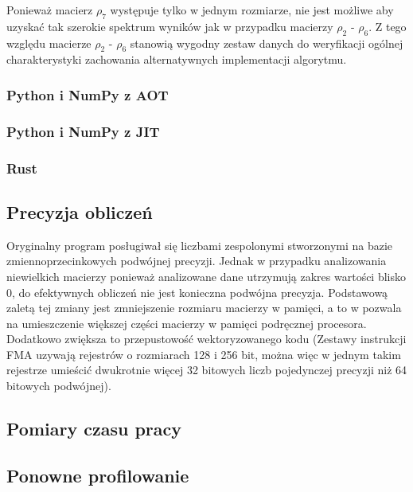 \documentclass[10pt, a4paper]{article}
\begin{document}
\begin{sloppypar}
    Ponieważ macierz $\rho_{7}$ występuje tylko w jednym rozmiarze, nie jest możliwe aby
    uzyskać tak szerokie spektrum wyników jak w przypadku macierzy $\rho_{2}$ - $\rho_{6}$.
    Z tego względu macierze $\rho_{2}$ - $\rho_{6}$ stanowią wygodny zestaw danych do
    weryfikacji ogólnej charakterystyki zachowania alternatywnych implementacji
    algorytmu.

    \subsubsection{ Python i NumPy z AOT }


    \subsubsection{ Python i NumPy z JIT }


    \subsubsection{ Rust }


    \subsection{Precyzja obliczeń}


    Oryginalny program posługiwał się liczbami zespolonymi stworzonymi na bazie
    zmiennoprzecinkowych podwójnej precyzji. Jednak w przypadku analizowania niewielkich
    macierzy ponieważ analizowane dane utrzymują zakres wartości blisko 0, do
    efektywnych obliczeń nie jest konieczna podwójna precyzja. Podstawową zaletą tej zmiany
    jest zmniejszenie rozmiaru macierzy w pamięci, a to w pozwala na umieszczenie
    większej części macierzy w pamięci podręcznej procesora. Dodatkowo zwiększa to przepustowość
    wektoryzowanego kodu (Zestawy instrukcji FMA uzywają rejestrów o rozmiarach 128 i
    256 bit, można więc w jednym takim rejestrze umieścić dwukrotnie więcej 32 bitowych liczb
    pojedynczej precyzji niż 64 bitowych podwójnej).

    \subsection{Pomiary czasu pracy}


    \subsection{Ponowne profilowanie}



\end{sloppypar}
\end{document}
